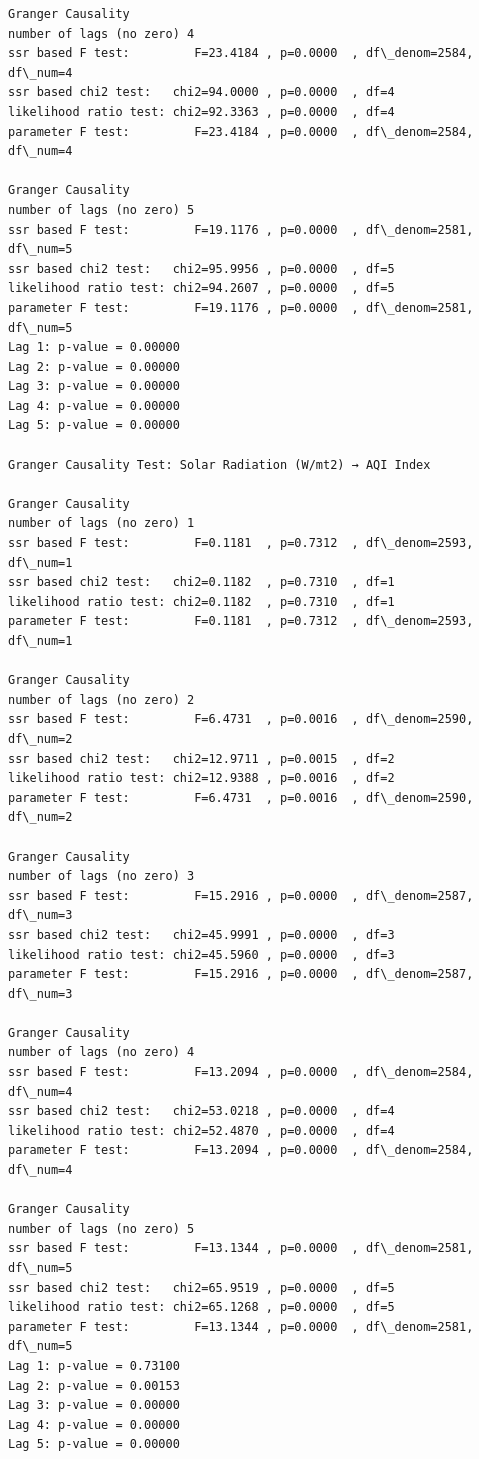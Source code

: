 \documentclass[11pt]{article}
\begin{document}
\begin{Verbatim}[commandchars=\\\{\}]
Granger Causality
number of lags (no zero) 4
ssr based F test:         F=23.4184 , p=0.0000  , df\_denom=2584, df\_num=4
ssr based chi2 test:   chi2=94.0000 , p=0.0000  , df=4
likelihood ratio test: chi2=92.3363 , p=0.0000  , df=4
parameter F test:         F=23.4184 , p=0.0000  , df\_denom=2584, df\_num=4

Granger Causality
number of lags (no zero) 5
ssr based F test:         F=19.1176 , p=0.0000  , df\_denom=2581, df\_num=5
ssr based chi2 test:   chi2=95.9956 , p=0.0000  , df=5
likelihood ratio test: chi2=94.2607 , p=0.0000  , df=5
parameter F test:         F=19.1176 , p=0.0000  , df\_denom=2581, df\_num=5
Lag 1: p-value = 0.00000
Lag 2: p-value = 0.00000
Lag 3: p-value = 0.00000
Lag 4: p-value = 0.00000
Lag 5: p-value = 0.00000

Granger Causality Test: Solar Radiation (W/mt2) → AQI Index

Granger Causality
number of lags (no zero) 1
ssr based F test:         F=0.1181  , p=0.7312  , df\_denom=2593, df\_num=1
ssr based chi2 test:   chi2=0.1182  , p=0.7310  , df=1
likelihood ratio test: chi2=0.1182  , p=0.7310  , df=1
parameter F test:         F=0.1181  , p=0.7312  , df\_denom=2593, df\_num=1

Granger Causality
number of lags (no zero) 2
ssr based F test:         F=6.4731  , p=0.0016  , df\_denom=2590, df\_num=2
ssr based chi2 test:   chi2=12.9711 , p=0.0015  , df=2
likelihood ratio test: chi2=12.9388 , p=0.0016  , df=2
parameter F test:         F=6.4731  , p=0.0016  , df\_denom=2590, df\_num=2

Granger Causality
number of lags (no zero) 3
ssr based F test:         F=15.2916 , p=0.0000  , df\_denom=2587, df\_num=3
ssr based chi2 test:   chi2=45.9991 , p=0.0000  , df=3
likelihood ratio test: chi2=45.5960 , p=0.0000  , df=3
parameter F test:         F=15.2916 , p=0.0000  , df\_denom=2587, df\_num=3

Granger Causality
number of lags (no zero) 4
ssr based F test:         F=13.2094 , p=0.0000  , df\_denom=2584, df\_num=4
ssr based chi2 test:   chi2=53.0218 , p=0.0000  , df=4
likelihood ratio test: chi2=52.4870 , p=0.0000  , df=4
parameter F test:         F=13.2094 , p=0.0000  , df\_denom=2584, df\_num=4

Granger Causality
number of lags (no zero) 5
ssr based F test:         F=13.1344 , p=0.0000  , df\_denom=2581, df\_num=5
ssr based chi2 test:   chi2=65.9519 , p=0.0000  , df=5
likelihood ratio test: chi2=65.1268 , p=0.0000  , df=5
parameter F test:         F=13.1344 , p=0.0000  , df\_denom=2581, df\_num=5
Lag 1: p-value = 0.73100
Lag 2: p-value = 0.00153
Lag 3: p-value = 0.00000
Lag 4: p-value = 0.00000
Lag 5: p-value = 0.00000


\end{Verbatim}
\end{document}
